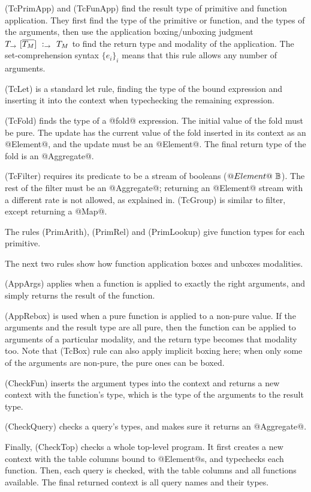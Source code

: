 (TcPrimApp) and (TcFunApp) find the result type of primitive and function application.
They first find the type of the primitive or function, and the types of the arguments, then use the application boxing/unboxing judgment $T_\to~[\overline{T_M}]~:_\to~T_M$ to find the return type and modality of the application.
The set-comprehension syntax $\{e_i\}_i$ means that this rule allows any number of arguments.

(TcLet) is a standard let rule, finding the type of the bound expression and inserting it into the context when typechecking the remaining expression.

(TcFold) finds the type of a @fold@ expression.
The initial value of the fold must be pure.
The update has the current value of the fold inserted in its context as an @Element@, and the update must be an @Element@.
The final return type of the fold is an @Aggregate@.

(TcFilter) requires its predicate to be a stream of booleans ($@Element@~\mathbb{B}$).
The rest of the filter must be an @Aggregate@; returning an @Element@ stream with a different rate is not allowed, as explained in.
(TcGroup) is similar to filter, except returning a @Map@.

The rules (PrimArith), (PrimRel) and (PrimLookup) give function types for each primitive.

The next two rules show how function application boxes and unboxes modalities.

(AppArgs) applies when a function is applied to exactly the right arguments, and simply returns the result of the function.

(AppRebox) is used when a pure function is applied to a non-pure value.
If the arguments and the result type are all pure, then the function can be applied to arguments of a particular modality, and the return type becomes that modality too.
Note that (TcBox) rule can also apply implicit boxing here; when only some of the arguments are non-pure, the pure ones can be boxed.

(CheckFun) inserts the argument types into the context and returns a new context with the function's type, which is the type of the arguments to the result type.

(CheckQuery) checks a query's types, and makes sure it returns an @Aggregate@.

Finally, (CheckTop) checks a whole top-level program.
It first creates a new context with the table columns bound to @Element@s, and typechecks each function.
Then, each query is checked, with the table columns and all functions available.
The final returned context is all query names and their types.

